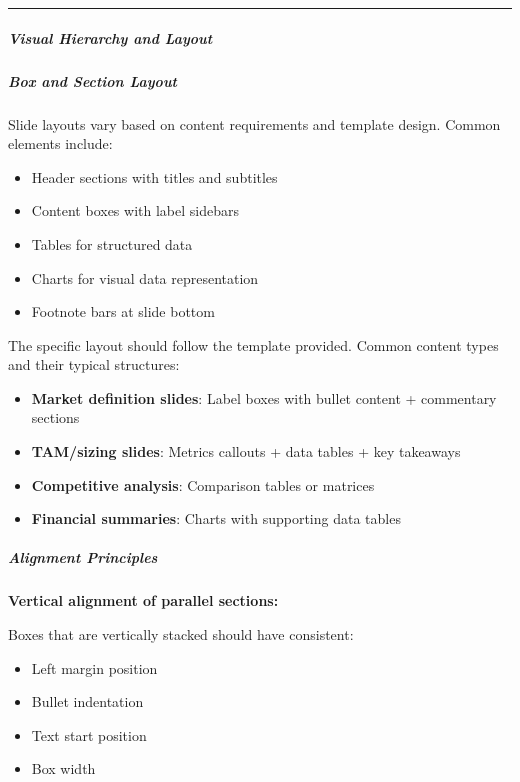 \documentclass[11pt]{article}
\begin{document}
\vspace{0.5em}\hrule\vspace{0.5em}

\subparagraph{Visual Hierarchy and Layout}\mbox{}\par

\subparagraph{Box and Section Layout}\mbox{}\par

Slide layouts vary based on content requirements and template design. Common elements include:

\begin{itemize}[leftmargin=*,itemsep=2pt,topsep=2pt]
\item {} Header sections with titles and subtitles
\item {} Content boxes with label sidebars
\item {} Tables for structured data
\item {} Charts for visual data representation
\item {} Footnote bars at slide bottom
\end{itemize}

The specific layout should follow the template provided. Common content types and their typical structures:

\begin{itemize}[leftmargin=*,itemsep=2pt,topsep=2pt]
\item {} \textbf{Market definition slides}: Label boxes with bullet content + commentary sections
\item {} \textbf{TAM/sizing slides}: Metrics callouts + data tables + key takeaways
\item {} \textbf{Competitive analysis}: Comparison tables or matrices
\item {} \textbf{Financial summaries}: Charts with supporting data tables
\end{itemize}

\subparagraph{Alignment Principles}\mbox{}\par

\textbf{Vertical alignment of parallel sections:}


Boxes that are vertically stacked should have consistent:

\begin{itemize}[leftmargin=*,itemsep=2pt,topsep=2pt]
\item {} Left margin position
\item {} Bullet indentation
\item {} Text start position
\item {} Box width
\end{itemize}
\end{document}
